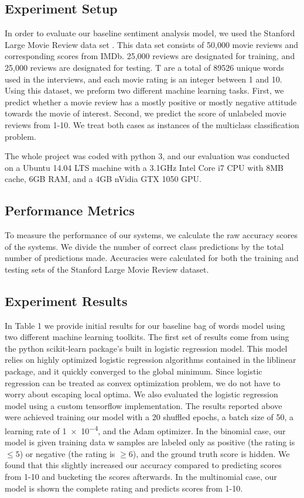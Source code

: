 \documentclass[conference]{IEEEtran}
\begin{document}
\subsection{Experiment Setup}
    In order to evaluate our baseline sentiment analysis model, we used the
    Stanford Large Movie Review data set \cite{maas2011learning}. This data
    set consists of 50,000 movie reviews and corresponding scores from IMDb.
    25,000 reviews are designated for training, and 25,000 reviews are designated for testing.
    T are a total of 89526 unique words used in the interviews, and each
    movie rating is an integer between 1 and 10. Using this dataset, we preform
    two different machine learning tasks. First, we predict whether a movie review
    has a mostly positive or mostly negative attitude towards the movie of interest. 
    Second, we predict the score of unlabeled movie reviews from 1-10. We treat
    both cases as instances of the multiclass classification problem.
    
    The whole project was coded with python 3, and our evaluation was conducted on
    a Ubuntu 14.04 LTS machine with a 3.1GHz Intel Core i7 CPU with 8MB cache,
    6GB RAM, and a 4GB nVidia GTX 1050 GPU.
    
\subsection{Performance Metrics}
    To measure the performance of our systems, we calculate the raw accuracy
    scores of the systems. We divide the number of correct class predictions
    by the total number of predictions made. Accuracies were calculated
    for both the training and testing sets of the Stanford Large Movie Review dataset.
    
\subsection{Experiment Results}
    In Table 1 we provide initial results for our baseline bag of words model using
    two different machine learning toolkits. The first set of results come from
    using the python scikit-learn package's built in logistic regression model.
    This model relies on highly optimized logistic regression algorithms
    contained in the liblinear \cite{Fan:2008:LLL:1390681.1442794} package,
    and it quickly converged to the global minimum. Since logistic regression
    can be treated as convex optimization problem, we do not have to worry 
    about escaping local optima. We also evaluated the logistic regression
    model using a custom tensorflow implementation. The results reported
    above were achieved training our model with a 20 shuffled epochs, a
    batch size of 50, a learning rate of \num{1e-4}, and the Adam optimizer.
    In the binomial case, our model is given training data w samples are
    labeled only as positive (the rating is $\leq 5$) or negative (the rating is
    $\geq 6$), and the ground truth score is hidden. We found that this slightly
    increased our accuracy compared to predicting scores from 1-10 and
    bucketing the scores afterwards. In the multinomial case, our model is
    shown the complete rating and predicts scores from 1-10.
    
\end{document}
